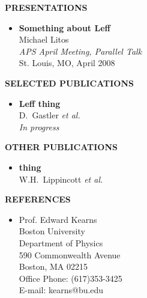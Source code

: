 \begin{singlespace}
\begin{comment}
\end{itemize}
\end{comment}

\noindent
{\bf PRESENTATIONS}
\begin{itemize}
  
\item{\bf Something about Leff}
  \\{}Michael Litos
  \\{}{\it APS April Meeting, Parallel Talk}
  \\{}St. Louis, MO,
  April 2008

\end{itemize}

\vspace{0.5cm}
\noindent
{\bf SELECTED PUBLICATIONS}

\begin{itemize}

\item {\bf Leff thing}
  \\D.~Gastler {\it et al.}       
  \\{\it In progress}

\end{itemize}

\vspace{0.5cm}
\noindent

{\bf OTHER PUBLICATIONS}

\begin{itemize}
\item {\bf \psd thing}
  \\W.H.~Lippincott {\it et al.} 

\end{itemize}

\noindent
{\bf REFERENCES}

\begin{itemize}

\item Prof. Edward Kearns
  \\{}Boston University
  \\{}Department of Physics
  \\{}590 Commonwealth Avenue
  \\{}Boston, MA 02215
  \\{}Office Phone: (617)353-3425
  \\{}E-mail: kearns@bu.edu

\end{itemize}

\end{singlespace}
